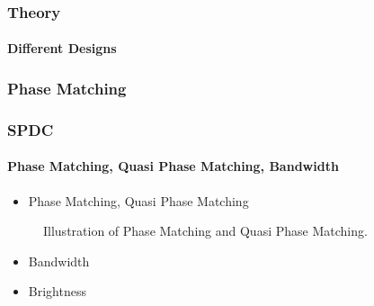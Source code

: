 \documentclass[serif,8pt]{beamer}
\begin{document}
{{\begin{frame}[t]
	\frametitle{Theory}
	\framesubtitle{Different Designs}
	\begin{figure}
		\begin{center}
		\end{center}
		\caption{}\label{whoisthis?}
	\end{figure}
\end{frame}

\subsubsection{Phase Matching}
\begin{frame}
	\frametitle{SPDC}
	\framesubtitle{Phase Matching, Quasi Phase Matching, Bandwidth}
	\begin{itemize}
		\item Phase Matching, Quasi Phase Matching
	\end{itemize}

	\begin{figure}
		\begin{center}
		  \quad
		\end{center}
		\caption{Illustration of Phase Matching and Quasi Phase Matching.}\label{fig:SPDCk}
	\end{figure}
	
	\begin{itemize}
		\item Bandwidth
		\item Brightness
	\end{itemize}
\end{frame}

}}
\end{document}
